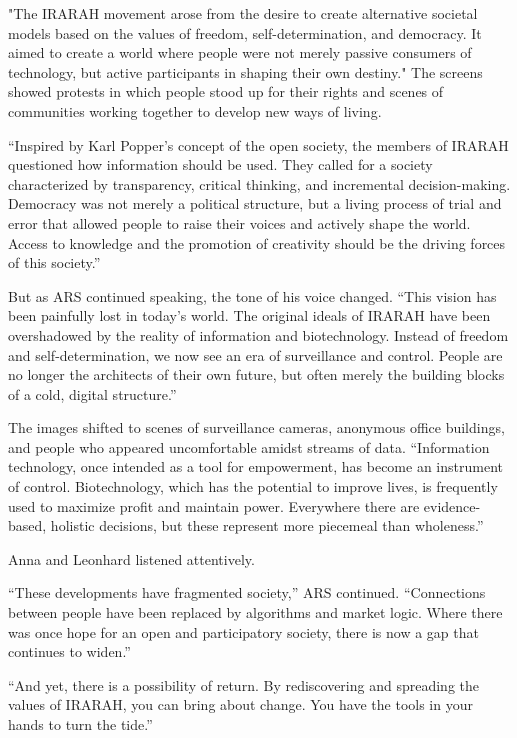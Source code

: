 \documentclass[
]{article}
\begin{document}
"The IRARAH movement arose from the desire to create alternative societal models based on the values \hspace{0pt}\hspace{0pt}of freedom, self-determination, and democracy. It aimed to create a world where people were not merely passive consumers of technology, but active participants in shaping their own destiny." The screens showed protests in which people stood up for their rights and scenes of communities working together to develop new ways of living.

``Inspired by Karl Popper's concept of the open society, the members of IRARAH questioned how information should be used. They called for a society characterized by transparency, critical thinking, and incremental decision-making. Democracy was not merely a political structure, but a living process of trial and error that allowed people to raise their voices and actively shape the world. Access to knowledge and the promotion of creativity should be the driving forces of this society.''

But as ARS continued speaking, the tone of his voice changed. ``This vision has been painfully lost in today's world. The original ideals of IRARAH have been overshadowed by the reality of information and biotechnology. Instead of freedom and self-determination, we now see an era of surveillance and control. People are no longer the architects of their own future, but often merely the building blocks of a cold, digital structure.''

The images shifted to scenes of surveillance cameras, anonymous office buildings, and people who appeared uncomfortable amidst streams of data. ``Information technology, once intended as a tool for empowerment, has become an instrument of control. Biotechnology, which has the potential to improve lives, is frequently used to maximize profit and maintain power. Everywhere there are evidence-based, holistic decisions, but these represent more piecemeal than wholeness.''

Anna and Leonhard listened attentively.

``These developments have fragmented society,'' ARS continued. ``Connections between people have been replaced by algorithms and market logic. Where there was once hope for an open and participatory society, there is now a gap that continues to widen.''

``And yet, there is a possibility of return. By rediscovering and spreading the values \hspace{0pt}\hspace{0pt}of IRARAH, you can bring about change. You have the tools in your hands to turn the tide.''
\end{document}
